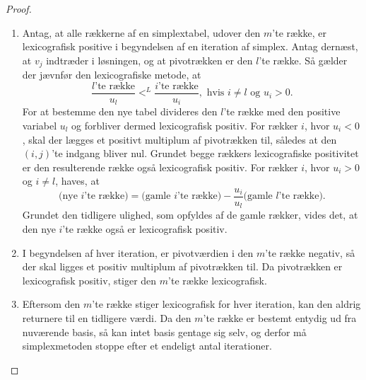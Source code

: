 \begin{proof}
\begin{enumerate}[label=(\alph*)]
\item Antag, at alle rækkerne af en simplextabel, udover den $m$'te række, er lexicografisk positive i begyndelsen af en iteration af simplex. 
Antag dernæst, at $v_j$ indtræder i løsningen, og at pivotrækken er den $l$'te række.
Så gælder der jævnfør den lexicografiske metode, at
$$\dfrac{l\text{'te række}}{u_l}<^L \dfrac{i\text{'te række}}{u_i}, \text{  hvis } i\neq l \text{ og }u_i>0.$$
For at bestemme den nye tabel divideres den $l$'te række med den positive variabel $u_l$ og forbliver dermed lexicografisk positiv.
For rækker $i$, hvor $u_i<0$, skal der lægges et positivt multiplum af pivotrækken til, således at den $(i,j)$'te indgang bliver nul. 
Grundet begge rækkers lexicografiske positivitet er den resulterende række også lexicografisk positiv. 
For rækker $i$, hvor $u_i>0$ og $i\neq l$, haves, at
$$\text{(nye }i\text{'te række)}=\text{(gamle }i\text{'te række)}-\dfrac{u_i}{u_l}\text{(gamle }l\text{'te række)}.$$
Grundet den tidligere ulighed, som opfyldes af de gamle rækker, vides det, at den nye $i$'te række også er lexicografisk positiv.
% 
\item I begyndelsen af hver iteration, er pivotværdien i den $m$'te række negativ, så der skal ligges et positiv multiplum af pivotrækken til. 
Da pivotrækken er lexicografisk positiv, stiger den $m$'te række lexicografisk.
% 
\item Eftersom den $m$'te række stiger lexicografisk for hver iteration, kan den aldrig returnere til en tidligere værdi.
Da den $m$'te række er bestemt entydig ud fra nuværende basis, så kan intet basis gentage sig selv, og derfor må simplexmetoden stoppe efter et endeligt antal iterationer.
\end{enumerate}
\end{proof}
%
%
%
%
%